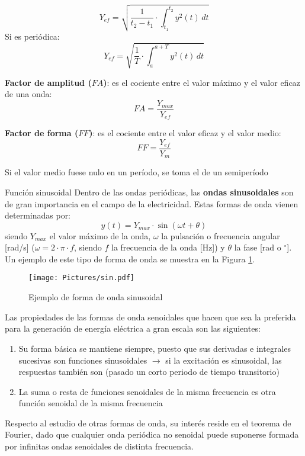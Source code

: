\documentclass[11pt]{book} %
\makeatletter
\numberwithin{dummy}{section}
\theoremstyle{ocrenumbox}
\theoremstyle{blacknumex}
\theoremstyle{blacknumbox}
\theoremstyle{ocrenum}
\newenvironment{remark}{\par\vspace{10pt}\small %
\begin{list}{}{
\leftmargin=35pt %
\rightmargin=25pt}\item\ignorespaces %
\makebox[-2.5pt]{\begin{tikzpicture}[overlay]
\node[draw=ocre!60,line width=1pt,circle,fill=ocre!25,font=\sffamily\bfseries,inner sep=2pt,outer sep=0pt] at (-15pt,0pt){\textcolor{ocre}{N}};\end{tikzpicture}} %
\advance\baselineskip -1pt}{\end{list}\vskip5pt} %
\renewcommand{\subsubsection}{\@startsection {subsubsection}{3}{\z@}
{-2ex \@plus -0.1ex \@minus -.2ex}
{.2ex \@plus.2ex }
{\normalfont\small\sffamily\bfseries}}
\newlength\esp
\makeatother
\begin{document}
\begin{itemize}
		\begin{equation*}
			Y_{ef}=\sqrt{\dfrac{1}{t_2-t_1}\cdot\int_{t_1}^{t_2}y^2(t)\, dt}
		\end{equation*}
		Si es periódica: 
		\begin{equation}
			\boxed{Y_{ef} = \sqrt{\frac{1}{T}\cdot\int_{a}^{a+T}y^{2}(t)\, dt}}
		\end{equation}
		\item \textbf{Factor de amplitud ($FA$)}: es el cociente entre el valor máximo y el valor eficaz de una onda:
		\begin{equation*}
			FA = \dfrac{Y_{max}}{Y_{ef}}
		\end{equation*}
		\item \textbf{Factor de forma ($FF$)}: es el cociente entre el valor eficaz y el valor medio:
		\begin{equation*}
			FF = \dfrac{Y_{ef}}{Y_{m}}
		\end{equation*}
		\begin{remark}
			Si el valor medio fuese nulo en un período, se toma el de un semiperíodo
		\end{remark}
	\end{itemize}
	
	\subsubsection{Función sinusoidal}\label{sec.sinusoidal}
	Dentro de las ondas periódicas, las \textbf{ondas sinusoidales} son de gran importancia en el campo de la electricidad. Estas formas de onda vienen determinadas por:
	\begin{equation}
		\boxed{y(t)=Y_{max}\cdot\sin(\omega t+\theta)} 
	\end{equation}
	siendo $Y_{max}$ el valor máximo de la onda, $\omega$ la pulsación o frecuencia angular [rad/s] ($\omega=2\cdot\pi\cdot f$, siendo $f$ la frecuencia de la onda [Hz]) y $\theta$ la fase [rad o $^\circ$]. Un ejemplo de este tipo de forma de onda se muestra en la Figura \ref{fig.sin}.
	\begin{figure}[htbp]
		\centering
		\texttt{[image: Pictures/sin.pdf]}
		\caption{Ejemplo de forma de onda sinusoidal}
		\label{fig.sin}
	\end{figure}
	
	Las propiedades de las formas de onda senoidales que hacen que sea la preferida para la generación de energía eléctrica a gran escala son las siguientes:
	\begin{enumerate}
		\item Su forma básica se mantiene siempre, puesto que sus derivadas e integrales sucesivas son funciones sinusoidales $\rightarrow$ si la excitación es sinusoidal, las respuestas también son (pasado un corto periodo de tiempo transitorio)
		\item La suma o resta de funciones senoidales de la misma frecuencia es otra función senoidal de la misma frecuencia
	\end{enumerate}
	Respecto al estudio de otras formas de onda, su interés reside en el teorema de Fourier, dado que cualquier onda periódica no senoidal puede suponerse formada por
	infinitas ondas senoidales de distinta frecuencia. 
	
\end{document}
